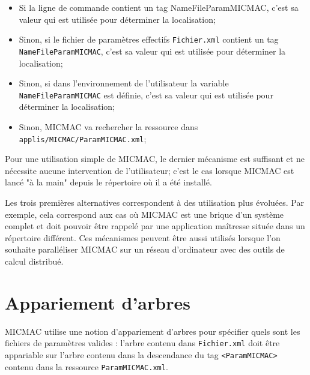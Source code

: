 \begin{itemize}
   \item Si la ligne de commande contient un tag NameFileParamMICMAC, c'est
         sa valeur qui est utilis\'ee pour  d\'eterminer la localisation;

   \item Sinon, si le fichier de param\`etres effectifs {\tt Fichier.xml}
         contient un tag {\tt NameFileParamMICMAC}, c'est sa valeur 
         qui est utilis\'ee pour  d\'eterminer la localisation;

    \item Sinon, si dans l'environnement de l'utilisateur la variable
         {\tt NameFileParamMICMAC} est d\'efinie, c'est sa valeur qui
         est utilis\'ee pour  d\'eterminer la localisation;

    \item Sinon,  MICMAC va rechercher la ressource dans 
          {\tt applis/MICMAC/ParamMICMAC.xml};
\end{itemize}


Pour une
utilisation simple de MICMAC, le dernier m\'ecanisme est suffisant
et ne n\'ecessite aucune intervention de l'utilisateur;
c'est le cas lorsque MICMAC est lanc\'e "\`a
la main" depuis le r\'epertoire  o\`u il a \'et\'e install\'e.

Les trois premi\`eres alternatives correspondent \`a des utilisation
plus \'evolu\'ees.  Par exemple, cela correspond aux cas o\`u MICMAC est
une brique d'un syst\`eme complet et doit pouvoir \^etre rappel\'e par
une application ma\^itresse situ\'ee dans un r\'epertoire diff\'erent.
Ces m\'ecanismes peuvent \^etre aussi utilis\'es lorsque l'on souhaite 
parall\'eliser  MICMAC sur un r\'eseau d'ordinateur avec des outils
de calcul distribu\'e.



\section{Appariement d'arbres}

\label{FR:Mic:Tree:Match}

MICMAC utilise une notion d'appariement d'arbres
pour  sp\'ecifier quels sont les fichiers de param\`etres valides :
l'arbre contenu dans {\tt Fichier.xml} doit \^etre appariable sur 
l'arbre contenu dans la descendance du  tag {\tt <ParamMICMAC>} contenu
dans la ressource {\tt ParamMICMAC.xml}.

